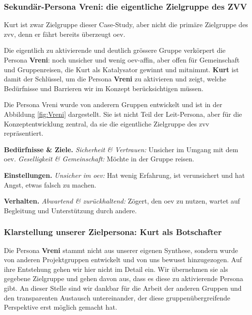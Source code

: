 \subsubsection{Sekundär-Persona Vreni: die eigentliche Zielgruppe des ZVV}

Kurt ist zwar Zielgruppe dieser Case-Study, aber nicht die primäre Zielgruppe des \gls{zvv}, denn er fährt bereits überzeugt \gls{oev}.

Die eigentlich zu aktivierende und deutlich grössere Gruppe verkörpert die Persona \textbf{Vreni}: noch unsicher und wenig \gls{oev}-affin, aber offen für Gemeinschaft und Gruppenreisen, die Kurt als Katalysator gewinnt und mitnimmt.
\textbf{Kurt} ist damit der Schlüssel, um die Persona \textbf{Vreni} zu aktivieren und zeigt, welche Bedürfnisse und Barrieren wir im Konzept berücksichtigen müssen.

Die Persona Vreni wurde von anderern Gruppen entwickelt und ist in der Abbildung \ref{fig:Vreni} dargestellt. Sie ist nicht Teil der Leit-Persona, aber für die Konzeptentwicklung zentral, da sie die eigentliche Zielgruppe des \gls{zvv} repräsentiert.

\textbf{Bedürfnisse \& Ziele.} \emph{Sicherheit \& Vertrauen:} Unsicher im Umgang mit dem \gls{oev}.
\emph{Geselligkeit \& Gemeinschaft:} Möchte in der Gruppe reisen.

\textbf{Einstellungen.} \emph{Unsicher im \gls{oev}:} Hat wenig Erfahrung, ist verunsichert und hat Angst, etwas falsch zu machen.

\textbf{Verhalten.} \emph{Abwartend \& zurückhaltend:} Zögert, den \gls{oev} zu nutzen, wartet auf Begleitung und Unterstützung durch andere.

\columnbreak

\subsubsection{Klarstellung unserer Zielpersona: Kurt als Botschafter}

Die Persona \textbf{Vreni} stammt nicht aus unserer eigenen Synthese, sondern wurde von anderen Projektgruppen entwickelt und von uns bewusst hinzugezogen.
Auf ihre Entstehung gehen wir hier nicht im Detail ein.
Wir übernehmen sie als gegebene Zielgruppe und gehen davon aus, dass es diese zu aktivierende Persona gibt.
An dieser Stelle sind wir dankbar für die Arbeit der anderen Gruppen und den transparenten Austausch untereinander, der diese gruppenübergreifende Perspektive erst möglich gemacht hat.

